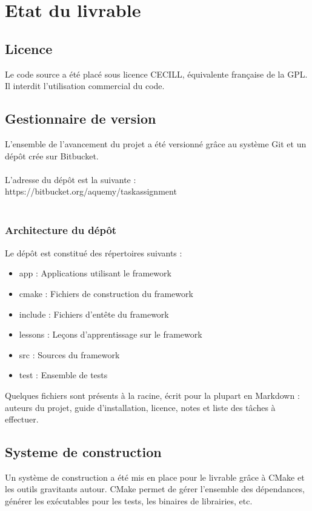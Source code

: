 \section{Etat du livrable}
\subsection{Licence}
Le code source a été placé sous licence CECILL, équivalente française de la GPL. Il interdit l'utilisation commercial du code.
\subsection{Gestionnaire de version}
L'ensemble de l'avancement du projet a été versionné grâce au système Git et un dépôt crée sur Bitbucket.\\\\

L'adresse du dépôt est la suivante : https://bitbucket.org/aquemy/taskassignment\\\\

\subsubsection{Architecture du dépôt}
Le dépôt est constitué des répertoires suivants :
\begin{itemize}
\item app : Applications utilisant le framework
\item cmake : Fichiers de construction du framework
\item include : Fichiers d'entête du framework
\item lessons : Leçons d'apprentissage sur le framework
\item src : Sources du framework
\item test : Ensemble de tests
\end{itemize}

Quelques fichiers sont présents à la racine, écrit pour la plupart en Markdown : auteurs du projet, guide d'installation, licence, notes et liste des tâches à effectuer.

\subsection{Systeme de construction}
Un système de construction a été mis en place pour le livrable grâce à CMake et les outils gravitants autour.
CMake permet de gérer l'ensemble des dépendances, générer les exécutables pour les tests, les binaires de librairies, etc.\\\\

